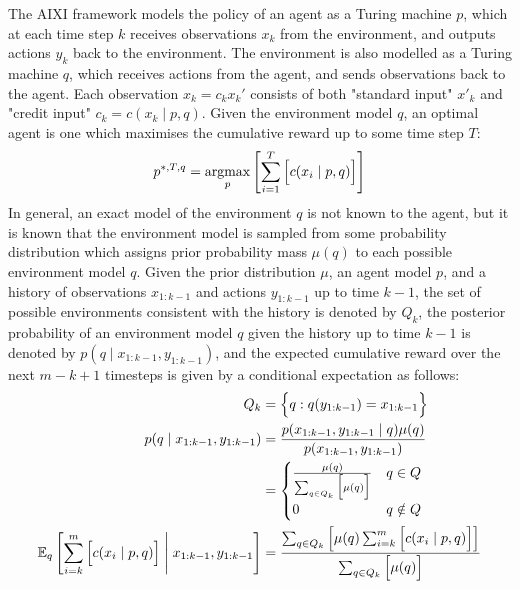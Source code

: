 The AIXI framework \cite{hutter2000theory} models the policy of an agent as a Turing machine $p$, which at each time step $k$ receives observations $x_k$ from the environment, and outputs actions $y_k$ back to the environment. The environment is also modelled as a Turing machine $q$, which receives actions from the agent, and sends observations back to the agent. Each observation $x_k=c_kx_k'$ consists of both "standard input" $x'_k$ and "credit input" $c_k=c(x_k \mid p, q)$. Given the environment model $q$, an optimal agent is one which maximises the cumulative reward up to some time step $T$:
\begin{equation*}
    p^{*,T,q} = \underset{p}{\operatorname{argmax}}\left[ \sum_{i=1}^T{\Bigl[ c(x_i \mid p, q) \Bigr]} \right]
\end{equation*}
In general, an exact model of the environment $q$ is not known to the agent, but it is known that the environment model is sampled from some probability distribution which assigns prior probability mass $\mu(q)$ to each possible environment model $q$. Given the prior distribution $\mu$, an agent model $p$, and a history of observations $x_{1:k-1}$ and actions $y_{1:k-1}$ up to time $k-1$, the set of possible environments consistent with the history is denoted by $Q_k$, the posterior probability of an environment model $q$ given the history up to time $k-1$ is denoted by $p(q\mid x_{1:k-1}, y_{1:k-1})$, and the expected cumulative reward over the next $m-k+1$ timesteps is given by a conditional expectation as follows:
\begin{align*}
    Q_k &= \Bigl\{ q:q(y_{1:k-1}) = x_{1:k-1} \Bigr\} \\
    p(q\mid x_{1:k-1}, y_{1:k-1}) &= \frac{p(x_{1:k-1}, y_{1:k-1}\mid q)\mu(q)}{p(x_{1:k-1}, y_{1:k-1})} \\
    &= \begin{cases}
        \frac{\mu(q)}{\sum_{q\in Q_k}{\Bigl[ \mu(q) \Bigr]}} & q\in Q \\
        0 & q\notin Q \\
    \end{cases} \\
    \mathbb{E}_q\left[ \sum_{i=k}^{m}{\Bigl[ c(x_i \mid p, q) \Bigr]} \;\middle\vert\; x_{1:k-1}, y_{1:k-1} \right] &= \frac{\sum_{q\in Q_k}{\left[ \mu(q) \sum_{i=k}^{m}{\Bigl[ c(x_i \mid p, q) \Bigr]} \right]}}{\sum_{q\in Q_k}{\Bigl[ \mu(q) \Bigr]}}
\end{align*}
\pagebreak

